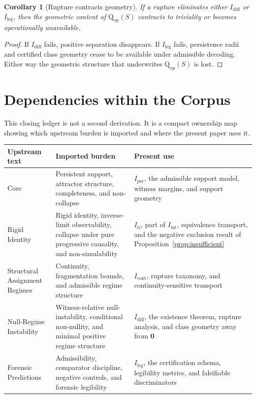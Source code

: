 \documentclass[11pt,a4paper]{article}
\newtheorem{corollary}[theorem]{Corollary}
\theoremstyle{definition}
\newcommand{\Qop}{\mathrm{Q}_{\mathrm{op}}}
\newcommand{\Iper}{I_{\mathrm{per}}}
\newcommand{\Iri}{I_{\mathrm{ri}}}
\newcommand{\Iint}{I_{\mathrm{int}}}
\newcommand{\Icont}{I_{\mathrm{cont}}}
\newcommand{\Idiff}{I_{\mathrm{diff}}}
\newcommand{\Ileg}{I_{\mathrm{leg}}}
\newcommand{\nullclass}{\mathbf{0}}
\begin{document}
\begin{corollary}[Rupture contracts geometry]\label{cor:geometry-rupture}
If a rupture eliminates either $\Idiff$ or $\Ileg$, then the geometric content of $\Qop(S)$ contracts to triviality or becomes operationally unavailable.
\end{corollary}

\begin{proof}
If $\Idiff$ fails, positive separation disappears. If $\Ileg$ fails, persistence radii and certified class geometry cease to be available under admissible decoding. Either way the geometric structure that underwrites $\Qop(S)$ is lost.
\end{proof}

\section{Dependencies within the Corpus}
This closing ledger is not a second derivation. It is a compact ownership map showing which upstream burden is imported and where the present paper uses it.
\begin{center}
\small
\renewcommand{\arraystretch}{1.14}
\setlength{\tabcolsep}{4.5pt}
\begin{tabularx}{\textwidth}{>{\raggedright\arraybackslash}p{1.55cm} >{\raggedright\arraybackslash}p{4.5cm} Y}
\toprule
Upstream text & Imported burden & Present use \\
\midrule
Core \cite{core} & Persistent support, attractor structure, completeness, and non-collapse & $\Iper$, the admissible support model, witness margins, and support geometry \\
Rigid Identity \cite{paper1} & Rigid identity, inverse-limit observability, collapse under pure progressive causality, and non-simulability & $\Iri$, part of $\Iint$, equivalence transport, and the negative exclusion result of Proposition~\ref{prop:insufficient} \\
Structural Assignment Regimes \cite{paper2} & Continuity, fragmentation bounds, and admissible regime structure & $\Icont$, rupture taxonomy, and continuity-sensitive transport \\
Null-Regime Instability \cite{paper3} & Witness-relative null-instability, conditional non-nullity, and minimal positive regime structure & $\Idiff$, the existence theorem, rupture analysis, and class geometry away from $\nullclass$ \\
Forensic Predictions \cite{paper4} & Admissibility, comparator discipline, negative controls, and forensic legibility & $\Ileg$, the certification schema, legibility metrics, and falsifiable discriminators \\
\bottomrule
\end{tabularx}
\end{center}
\end{document}
